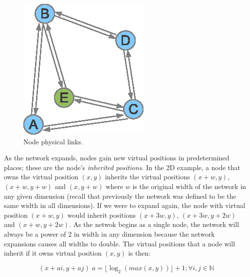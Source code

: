 \documentclass[ %
                    author={Luke Murray},
                supervisor={Dr. Simon Hollis},
                     title={Shadow Peer-to-Peer Networks},
                  subtitle={},
                    degree={MEng},
                      year={2013} ]{thesis}
\begin{document}
\begin{figure}[h]
\begin{minipage}[b]{0.35\linewidth}
        \includegraphics[width=\linewidth]{diagrams/network_join2.eps}
        \caption{Node physical links.}
        \label{join2}
    \end{minipage}
\end{figure}

As the network expands, nodes gain new virtual positions in predetermined places; these are the node's {\em inherited positions}. In the 2D example, a node that owns the virtual position $(x, y)$ inherits the virtual positions $(x + w, y)$, $(x + w, y + w)$ and $(x, y + w)$ where $w$ is the original width of the network in any given dimension (recall that previously the network was defined to be the same width in all dimensions). If we were to expand again, the node with virtual position $(x + w, y)$ would inherit positions $(x + 3w, y)$, $(x + 3w, y + 2w)$ and $(x + w, y + 2w)$. As the netwok begins as a single node, the network will always be a power of 2 in width in any dimension because the network expansions causes all widths to double. The virtual positions that a node will inherit if it owns virtual position $(x, y)$ is then:

\[(x + ai, y + aj)\; a = \lfloor \log_{2}{(max(x,y))} \rfloor + 1; \forall i,j \in \mathbb{N}\]
\end{document}
